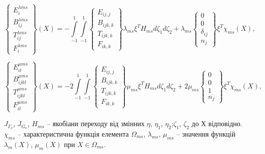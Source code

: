 \begin{equation*}
    \left\{ \begin{array}{lr} E_{i}^{\lambda m s} \\ B_{ij}^{\lambda m s} \\ T_{ij}^{\lambda m s} \\ F_{i}^{\lambda m s} \end{array} \right \} (X) =
    - \int \limits_{-1}^1 \int \limits_{-1}^1 
        \left\{ \begin{array}{lr} E_{ij,j} \\ B_{ijk,k} \\ T_{ijk,k} \\ F_{ik,k} \end{array} \right \} \lambda_{ms} \xi^T H_{ms} d \zeta_1 d \zeta_2 +
    \lambda_{ms} \left\{ \begin{array}{lr} 0 \\ 0 \\ \delta_{ij} \\ n_j \end{array} \right \} \xi^T \chi_{ms}(X),
\end{equation*}

\begin{equation*}
    \left\{ \begin{array}{lr} E_{il}^{\mu m s} \\ B_{ijkl}^{\mu m s} \\ T_{ijkl}^{\mu m s} \\ F_{il}^{\mu m s} \end{array} \right \} (X) =
    -2 \int \limits_{-1}^1 \int \limits_{-1}^1
        \left\{ \begin{array}{lr} E_{ij,j} \\ B_{ijk,k} \\ T_{ijk,k} \\ F_{ik,k} \end{array} \right \} \mu_{ms} \xi^T H_{ms} d \zeta_1 d \zeta_2 +
    2 \mu_{ms} \left\{ \begin{array}{lr} 0 \\ 0 \\ 1 \\ n_j \end{array} \right \} \xi^T \chi_{ms}(X),
\end{equation*}

$J_{\Gamma_{v}}$, $J_{G_{v}}$, $H_{ms}$ -- якобіани переходу від змінних $\eta$, $\eta_1$, $\eta_2$;$\zeta_1$, $\zeta_2$
до Х відповідно. $\chi_{ms}$ -- характеристична функція елемента $\Omega_{ms}$, $\lambda_{ms}$, $\mu_{ms}$ -- значення
функцій $\lambda_{m}(X)$, $\mu_{m}(X)$ при $X\in\Omega_{ms}$.

